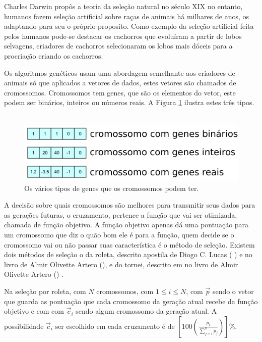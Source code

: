 \documentclass[10pt,a4paper]{article}
\begin{document}
Charles Darwin  propôs a teoria da seleção natural no século XIX no entanto, humanos fazem seleção artificial sobre raças de animais há milhares de anos, os adaptando para seu o próprio proposito. Como exemplo da seleção artificial feita pelos humanos pode-se destacar os cachorros que evoluíram a partir de lobos selvagens, criadores de cachorros selecionaram os lobos mais dóceis para a procriação criando os cachorros.

Os algoritmos genéticos usam uma abordagem semelhante aos criadores de animais só que aplicados a vetores de dados, estes vetores são chamados de cromossomos. Cromossomos tem genes, que são os elementos do vetor, este podem ser binários, inteiros ou números reais. A Figura \ref{fig:ExemploDeVetores} ilustra estes três tipos.\\ \\
\begin{figure}[H]
  \center
  \includegraphics[scale=0.6]{imgs/tiposDeCromossomo.pdf}            
  \caption{Os vários tipos de genes que os cromossomos podem ter.}
  \label{fig:ExemploDeVetores}
\end{figure} 

A decisão sobre quais cromossomos são melhores para transmitir seus dados para as gerações futuras, o cruzamento, pertence a função que vai ser otimizada, chamada de função objetivo. A função objetivo apenas dá uma pontuação para um cromossomo que diz o quão bom ele é para a função, quem decide se o cromossomo vai ou não passar suas característica é o método de seleção. Existem dois métodos de seleção o da roleta, descrito apostila de  Diogo C. Lucas ( \cite{UFRGS-Apostila-GA}) e no livro de Almir Olivette Artero (\cite{Livro-De-IA}), e do tornei, descrito em   no livro de  Almir Olivette Artero (\cite{Livro-De-IA}) .

 Na seleção por roleta, com $N$ cromossomos, com $1 \le i \le N$, com $\vec{p}$ sendo o vetor que guarda as pontuação que cada cromossomo da geração atual recebe da função objetivo e com com $\vec{c}_i$ sendo algum cromossomo da geração atual. A possibilidade  $\vec{c}_i$ ser escolhido em cada cruzamento é de $\left [100 \left ( \frac{p_{i}}{\sum \limits_{j=i}^{n} p_{j}}\right ) \right ]\%$. 
 
\end{document}
